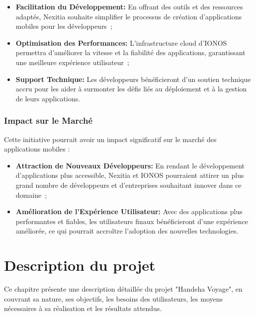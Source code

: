 \documentclass[12pt]{report}
\begin{document}
				\begin{itemize}
					\item \textbf{Facilitation du Développement:} En offrant des outils et des ressources adaptés, Nexitia souhaite simplifier le processus de création d'applications mobiles pour les développeurs ;
					\item \textbf{Optimisation des Performances:} L'infrastructure cloud d'IONOS permettra d'améliorer la vitesse et la fiabilité des applications, garantissant une meilleure expérience utilisateur ;
					\item \textbf{Support Technique:} Les développeurs bénéficieront d'un soutien technique accru pour les aider à surmonter les défis liés au déploiement et à la gestion de leurs applications.
				\end{itemize}

				 \subsection{Impact sur le Marché}

				Cette initiative pourrait avoir un impact significatif sur le marché des applications mobiles :

				\begin{itemize}
					\item \textbf{Attraction de Nouveaux Développeurs:} En rendant le développement d'applications plus accessible, Nexitia et IONOS pourraient attirer un plus grand nombre de développeurs et d'entreprises souhaitant innover dans ce domaine ;
					\item \textbf{Amélioration de l'Expérience Utilisateur:} Avec des applications plus performantes et fiables, les utilisateurs finaux bénéficieront d'une expérience améliorée, ce qui pourrait accroître l'adoption des nouvelles technologies.
				\end{itemize}





				\chapter{Description du projet}

				\hspace{15pt} Ce chapitre présente une description détaillée du projet "Handeha Voyage", en couvrant sa nature, ses objectifs, les besoins des utilisateurs, les moyens nécessaires à sa réalisation et les résultats attendus.
\end{document}
